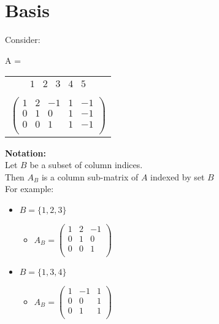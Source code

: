 \documentclass[letterpaper, 12pt]{article}
\begin{document}
    \pagebreak

    \section{Basis}
    Consider:\\
    \begin{center}
        A = \begin{tabular}{c}
            $\begin{matrix}
                1 & 2 & 3 & 4 & 5\\
            \end{matrix}$\\
            $\begin{pmatrix}
                1 & 2 & -1 & 1 & -1\\
                0 & 1 & 0 & 1 & -1\\
                0 & 0 & 1 & 1 & -1\\
            \end{pmatrix}$\\
        \end{tabular}
    \end{center}
    \textbf{Notation:}\\
    Let $B$ be a subset of column indices.\\
    Then $A_B$ is a column sub-matrix of $A$ indexed by set $B$\\
    \bigskip
    For example:\\
    \begin{itemize}
        \item $B = \{1, 2, 3\}$
        \begin{itemize}
            \item $A_B = \begin{pmatrix}
                1 & 2 & -1\\
                0 & 1 & 0\\
                0 & 0 & 1\\
            \end{pmatrix}$
        \end{itemize}
        \item $B = \{1, 3, 4\}$
        \begin{itemize}
            \item $A_B = \begin{pmatrix}
                1 & -1 & 1\\
                0 & 0 & 1\\
                0 & 1 & 1\\
            \end{pmatrix}$
        \end{itemize}
    \end{itemize}
\end{document}
